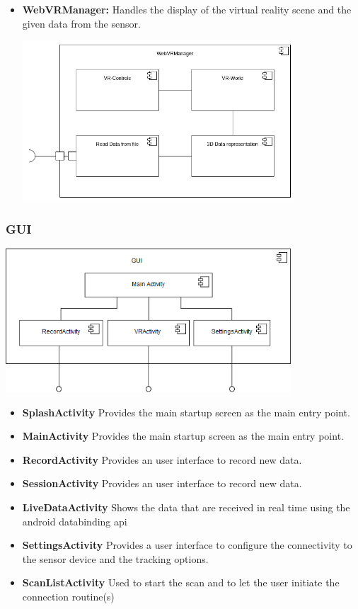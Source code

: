 \begin{itemize}
  \item \textbf{WebVRManager:} Handles the display of the virtual reality scene and the given data from the sensor.

 \includegraphics[width=0.8\textwidth]{pics/WebVRManager.png}

\end{itemize}

\subsubsection{GUI}

\includegraphics[width=0.8\textwidth]{pics/GUI-component.png}

\begin{itemize} %
  \item \textbf{SplashActivity} Provides the main startup screen as the main entry point.
  \item \textbf{MainActivity} Provides the main startup screen as the main entry point.
  \item \textbf{RecordActivity} Provides an user interface to record new data.
  \item \textbf{SessionActivity} Provides an user interface to record new data.
  \item \textbf{LiveDataActivity} Shows the data that are received in real time using the android databinding api
  \item \textbf{SettingsActivity} Provides a user interface to configure the connectivity to the sensor device and the tracking options.
  \item \textbf{ScanListActivity} Used to start the scan and to let the user initiate the connection routine(s)
\end{itemize}

